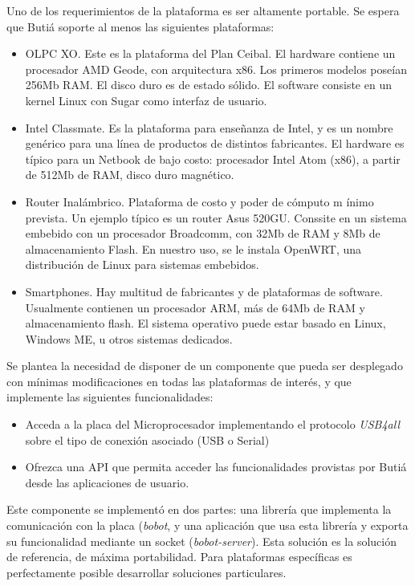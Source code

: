Uno de los requerimientos de la plataforma es ser altamente portable. Se espera que Buti\'a soporte al menos las siguientes plataformas:

\begin{itemize}
\item OLPC XO. Este es la plataforma del Plan Ceibal. El hardware contiene un procesador AMD Geode, con arquitectura x86. Los primeros modelos poseían 256Mb RAM. El disco duro es de estado s\'olido. El software consiste en un kernel Linux con Sugar como interfaz de usuario. 
\item Intel Classmate. Es la plataforma para enseñanza de Intel, y es un nombre gen\'erico para una línea de productos de distintos fabricantes. El hardware es t\'ipico para un Netbook de bajo costo: procesador Intel Atom (x86), a partir de 512Mb de RAM, disco duro magn\'etico.
\item Router Inal\'ambrico. Plataforma de costo y poder de c\'omputo m \'inimo prevista. Un ejemplo típico es un router Asus 520GU. Conssite en un sistema embebido con un procesador Broadcomm, con 32Mb de RAM y 8Mb de almacenamiento Flash. En nuestro uso, se le instala OpenWRT, una distribuci\'on de Linux para sistemas embebidos.
\item Smartphones. Hay multitud de fabricantes y de plataformas de software. Usualmente contienen un procesador ARM, más de 64Mb de RAM y almacenamiento flash. El sistema operativo puede estar basado en Linux, Windows ME, u otros sistemas dedicados.
\end{itemize}

Se plantea la necesidad de disponer de un componente que pueda ser desplegado con m\'inimas modificaciones en todas las plataformas de interés, y que implemente las siguientes funcionalidades:

\begin{itemize}
\item Acceda a la placa del Microprocesador implementando el protocolo \textit{USB4all} sobre el tipo de conexi\'on asociado (USB o Serial)
\item Ofrezca una API que permita acceder las funcionalidades provistas por Butiá desde las aplicaciones de usuario.
\end{itemize}

Este componente se implementó en dos partes: una librería que implementa la comunicación con la placa (\textit{bobot}, y una aplicación que usa esta librería y exporta su funcionalidad mediante un socket (\textit{bobot-server}). Esta solución es la solución de referencia, de máxima portabilidad. Para plataformas específicas es perfectamente posible desarrollar soluciones particulares.

